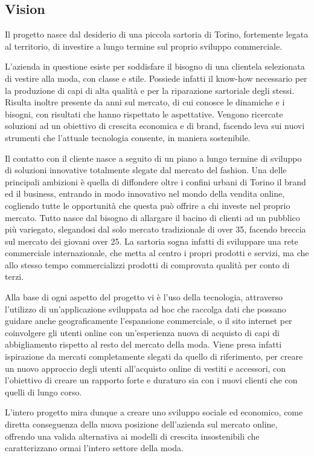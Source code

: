 \documentclass[12pt]{article}
\begin{document}
\subsection{Vision}

Il progetto nasce dal desiderio di una piccola sartoria di Torino, fortemente legata al territorio, di investire a lungo termine sul proprio sviluppo commerciale.

L'azienda in questione esiste per soddisfare il bisogno di una clientela selezionata di vestire alla moda, con classe e stile. Possiede infatti il know-how necessario per la produzione di capi di alta qualità e per la riparazione sartoriale degli stessi. Risulta inoltre presente da anni sul mercato, di cui conosce le dinamiche e i bisogni, con risultati che hanno rispettato le aspettative.
Vengono ricercate soluzioni ad un obiettivo di crescita economica e di brand, facendo leva sui nuovi strumenti che l'attuale tecnologia consente, in maniera sostenibile.

Il contatto con il cliente nasce a seguito di un piano a lungo termine di sviluppo di soluzioni innovative totalmente slegate dal mercato del fashion.
Una delle principali ambizioni è quella di diffondere oltre i confini urbani di Torino il brand ed il business, entrando in modo innovativo nel mondo della vendita online, cogliendo tutte le opportunità che questa può offrire a chi investe nel proprio mercato.
Tutto nasce dal bisogno di allargare il bacino di clienti ad un pubblico più variegato, slegandosi dal solo mercato tradizionale di over 35, facendo breccia sul mercato dei giovani over 25.
La sartoria sogna infatti di sviluppare una rete commerciale internazionale, che metta al centro i propri prodotti e servizi, ma che allo stesso tempo commercializzi prodotti di comprovata qualità per conto di terzi.

Alla base di ogni aspetto del progetto vi è l'uso della tecnologia, attraverso l'utilizzo di un'applicazione sviluppata ad hoc che raccolga dati che possano guidare anche geograficamente l'espansione commerciale, o il sito internet per coinvolgere gli utenti online con un'esperienza nuova di acquisto di capi di abbigliamento rispetto al resto del mercato della moda.
Viene presa infatti ispirazione da mercati completamente slegati da quello di riferimento, per creare un nuovo approccio degli utenti all'acquisto online di vestiti e accessori, con l'obiettivo di creare un rapporto forte e duraturo sia con i nuovi clienti che con quelli di lungo corso.

L'intero progetto mira dunque a creare uno sviluppo sociale ed economico, come diretta conseguenza della nuova posizione dell'azienda sul mercato online, offrendo una valida alternativa ai modelli di crescita insostenibili che caratterizzano ormai l'intero settore della moda.
\end{document}
